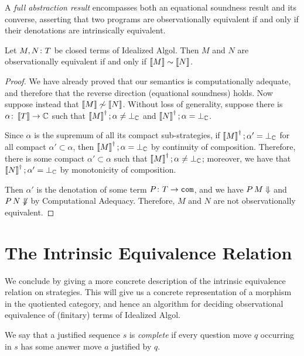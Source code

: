 \begin{definition}
  A \emph{full abstraction result} encompasses both an equational soundness result and its converse, asserting that two programs are observationally equivalent if and only if their denotations are intrinsically equivalent.
\end{definition}

\begin{theorem}
  Let $M,N\colon T$ be closed terms of Idealized Algol.  
  Then $M$ and $N$ are observationally equivalent if and only if $\left\llbracket M\right\rrbracket\sim\left\llbracket N\right\rrbracket$.
\end{theorem}
\begin{proof}
  We have already proved that our semantics is computationally adequate, and therefore that the reverse direction (equational soundness) holds.  
  Now suppose instead that $\left\llbracket M\right\rrbracket\not\sim\left\llbracket N\right\rrbracket$.
  Without loss of generality, suppose there is $\alpha\colon \left\llbracket T\right\rrbracket\to \mathbb{C}$ such that $\left\llbracket M\right\rrbracket^\dag;\alpha\ne\bot_{\mathbb{C}}$ and $\left\llbracket N\right\rrbracket^\dag;\alpha=\bot_{\mathbb{C}}$.

  Since $\alpha$ is the supremum of all its compact sub-strategies, if $\left\llbracket M\right\rrbracket^\dag;\alpha'=\bot_{\mathbb{C}}$ for all compact $\alpha'\subset \alpha$, then $\left\llbracket M\right\rrbracket^\dag;\alpha=\bot_{\mathbb{C}}$ by continuity of composition.  
  Therefore, there is some compact $\alpha'\subset\alpha$ such that $\left\llbracket M\right\rrbracket^\dag;\alpha\ne\bot_{\mathbb{C}}$; moreover, we have that $\left\llbracket N\right\rrbracket^\dag;\alpha'=\bot_{\mathbb{C}}$ by monotonicity of composition.  

  Then $\alpha'$ is the denotation of some term $P\colon T \to {\mathtt{com}}$, and we have $P\,M\Downarrow$ and $P\,N\not\Downarrow$ by Computational Adequacy.  
  Therefore, $M$ and $N$ are not observationally equivalent.
\end{proof}

\section{The Intrinsic Equivalence Relation}
\label{SecIntrinsicEquivalence}

We conclude by giving a more concrete description of the intrinsic equivalence relation on strategies.
This will give us a concrete representation of a morphism in the quotiented category, and hence an algorithm for deciding observational equivalence of (finitary) terms of Idealized Algol.

\begin{definition}
  We say that a justified sequence $s$ is \emph{complete} if every question move $q$ occurring in $s$ has some answer move $a$ justified by $q$.
\end{definition}

